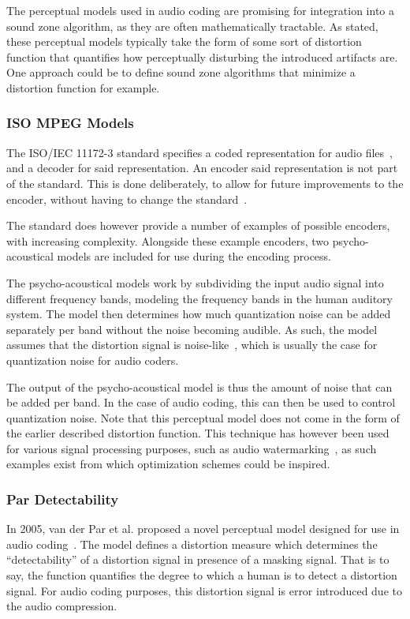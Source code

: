 The perceptual models used in audio coding are promising for integration into a sound zone algorithm, as they are 
often mathematically tractable.
As stated, these perceptual models typically take the form of some sort of distortion function that quantifies
how perceptually disturbing the introduced artifacts are. 
One approach could be to define sound zone algorithms that minimize a distortion function for example.

\subsubsection{ISO MPEG Models}
The ISO/IEC 11172-3 standard specifies a coded representation for audio files~\cite{ISO11172-3}, 
and a decoder for said representation.
An encoder said representation is not part of the standard.
This is done deliberately, to allow for future improvements to the encoder, without having to change the standard~\cite{pan1995tutorial}.

The standard does however provide a number of examples of possible encoders, with increasing complexity.
Alongside these example encoders, two psycho-acoustical models are included for use during the encoding process. 

The psycho-acoustical models work by subdividing the input audio signal into different frequency bands, 
modeling the frequency bands in the human auditory system.
The model then determines how much quantization noise can be added separately per band without the noise becoming audible.
As such, the model assumes that the distortion signal is noise-like~\cite{van2005perceptual}, which is usually
the case for quantization noise for audio coders.

The output of the psycho-acoustical model is thus the amount of noise that can be added per band.
In the case of audio coding, this can then be used to control quantization noise.
Note that this perceptual model does not come in the form of the earlier described distortion function.
This technique has however been used for various signal processing purposes, 
such as audio watermarking~\cite{taal2012low}, as such examples exist from which optimization schemes could be inspired.

\subsubsection{Par Detectability}
In 2005, van der Par et al. proposed a novel perceptual model designed for use in audio coding~\cite{van2005perceptual}.
The model defines a distortion measure which determines the ``detectability'' of a distortion signal 
in presence of a masking signal.
That is to say, the function quantifies the degree to which a human is to detect a distortion signal.
For audio coding purposes, this distortion signal is error introduced due to the audio compression.

